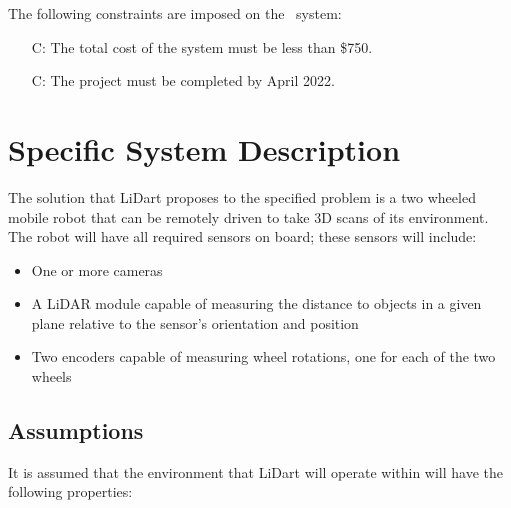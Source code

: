 \documentclass[12pt]{article}
\newcounter{constnum} %
\begin{document}
The following constraints are imposed on the \progname\ system:
\noindent \begin{itemize}
\item[C\refstepcounter{constnum}\theconstnum :] The total cost of the system must be less than \$750.
\item[C\refstepcounter{constnum}\theconstnum :] The project must be completed by April 2022.
\end{itemize}

\section{Specific System Description} 
\label{sec_SpecificDesc}

The solution that LiDart proposes to the specified problem is a two wheeled
mobile robot that can be remotely driven to take 3D scans of its environment.
The robot will have all required sensors on board; these sensors will include:

\begin{itemize}
\item One or more cameras
\item A LiDAR module capable of measuring the distance to objects in a given plane relative to the sensor's orientation and position
\item Two encoders capable of measuring wheel rotations, one for each of the two wheels
\end{itemize}

\subsection{Assumptions}

It is assumed that the environment that LiDart will operate within will have the following properties:
\end{document}
